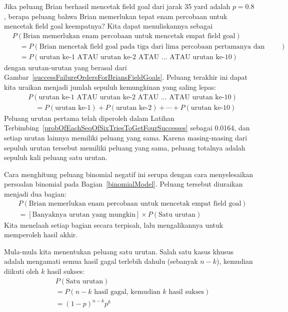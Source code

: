 Jika peluang Brian berhasil mencetak field goal dari jarak 35 yard adalah $p=0.8$, berapa peluang bahwa Brian memerlukan tepat enam percobaan untuk mencetak field goal keempatnya? Kita dapat menuliskannya sebagai
{\small\begin{align*}
&P(\text{Brian memerlukan enam percobaan untuk mencetak empat field goal}) \\
& \quad = P(\text{Brian mencetak field goal pada tiga dari lima percobaan pertamanya dan pada percobaan keenam}) \\
& \quad = P(\text{urutan ke-$1$ ATAU urutan ke-$2$ ATAU ... ATAU urutan ke-$10$})
\end{align*}
}dengan urutan-urutan yang berasal dari Gambar~\ref{successFailureOrdersForBriansFieldGoals}. Peluang terakhir ini dapat kita uraikan menjadi jumlah sepuluh kemungkinan yang saling lepas:
{\small\begin{align*}
&P(\text{urutan ke-$1$ ATAU urutan ke-$2$ ATAU ... ATAU urutan ke-$10$}) \\
&\quad = P(\text{urutan ke-$1$}) + P(\text{urutan ke-$2$}) + \cdots + P(\text{urutan ke-$10$})
\end{align*}
}Peluang urutan pertama telah diperoleh dalam Latihan Terbimbing~\ref{probOfEachSeqOfSixTriesToGetFourSuccesses} sebagai 0.0164, dan setiap urutan lainnya memiliki peluang yang sama. Karena masing-masing dari sepuluh urutan tersebut memiliki peluang yang sama, peluang totalnya adalah sepuluh kali peluang satu urutan.

Cara menghitung peluang binomial negatif ini serupa dengan cara menyelesaikan persoalan binomial pada Bagian~\ref{binomialModel}. Peluang tersebut diuraikan menjadi dua bagian:
\begin{align*}
&P(\text{Brian memerlukan enam percobaan untuk mencetak empat field goal}) \\
&= [\text{Banyaknya urutan yang mungkin}] \times P(\text{Satu urutan})
\end{align*}
Kita menelaah setiap bagian secara terpisah, lalu mengalikannya untuk memperoleh hasil akhir.

Mula-mula kita menentukan peluang satu urutan. Salah satu kasus khusus adalah mengamati semua hasil gagal terlebih dahulu (sebanyak $n-k$), kemudian diikuti oleh $k$ hasil sukses:
\begin{align*}
&P(\text{Satu urutan}) \\
&= P(\text{$n-k$ hasil gagal, kemudian $k$ hasil sukses}) \\
&= (1-p)^{n-k} p^{k}
\end{align*}

